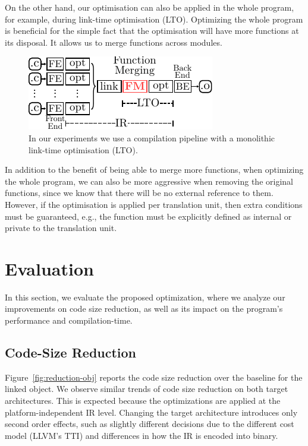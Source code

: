 On the other hand, our optimisation can also be applied in the whole program,
for example, during link-time optimisation (LTO).
Optimizing the whole program is beneficial for the simple fact that the
optimisation will have more functions at its disposal.
It allows us to merge functions across modules.

\begin{figure}[h]
  \centering
  \includegraphics[width=0.7\linewidth]{src/merging-optimisation/figs/opt-pipeline.pdf}
  \caption{In our experiments we use a compilation pipeline with a monolithic link-time optimisation (LTO).}
  \label{fig:opt-pipeline}
\end{figure}


In addition to the benefit of being able to merge more functions, when optimizing
the whole program, we can also be more aggressive when removing the original functions,
since we know that there will be no external reference to them.
However, if the optimisation is applied per translation unit, then extra
conditions must be guaranteed, e.g., the function must be explicitly defined
as internal or private to the translation unit.

\section{Evaluation}

In this section, we evaluate the proposed optimization, where we analyze our
improvements on code size reduction, as well as its impact on the program's
performance and compilation-time.

\subsection{Code-Size Reduction}

Figure~\ref{fig:reduction-obj} reports the code size reduction over the baseline for the linked object. %
We observe similar trends of code size reduction on both target architectures. This is expected because the
optimizations are applied at the platform-independent IR level. Changing the target architecture introduces only second order effects,
such as slightly different decisions due to the different cost model (LLVM's TTI) and differences in how the IR is encoded into binary.

